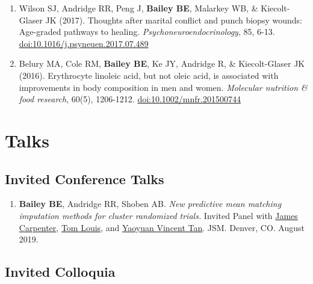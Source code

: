 \documentclass[
  fleqn, oneside]{article}
\providecommand{\tightlist}{%
  \setlength{\itemsep}{0pt}\setlength{\parskip}{0pt}}
\begin{document}
\begin{enumerate}
\item
  Wilson SJ, Andridge RR, Peng J, \textbf{Bailey BE}, Malarkey WB, \&
  Kiecolt-Glaser JK (2017). Thoughts after marital conflict and punch
  biopsy wounds: Age-graded pathways to healing.
  \emph{Psychoneuroendocrinology}, 85, 6-13.
  \href{https://doi.org/10.1016/j.psyneuen.2017.07.489}{doi:10.1016/j.psyneuen.2017.07.489}
\item
  Belury MA, Cole RM, \textbf{Bailey BE}, Ke JY, Andridge R, \&
  Kiecolt-Glaser JK (2016). Erythrocyte linoleic acid, but not oleic
  acid, is associated with improvements in body composition in men and
  women. \emph{Molecular nutrition \& food research}, 60(5), 1206-1212.
  \href{https://doi.org/10.1002/mnfr.201500744}{doi:10.1002/mnfr.201500744}
\end{enumerate}

\hypertarget{talks}{%
\section{Talks}\label{talks}}

\hypertarget{invited-conference-talks}{%
\subsection{Invited Conference Talks}\label{invited-conference-talks}}

\begin{enumerate}
\def\labelenumi{\arabic{enumi}.}
\tightlist
\item
  \textbf{Bailey BE}, Andridge RR, Shoben AB. \emph{New predictive mean
  matching imputation methods for cluster randomized trials.} Invited
  Panel with
  \href{https://www.lshtm.ac.uk/aboutus/people/carpenter.james}{James
  Carpenter},
  \href{https://www.jhsph.edu/faculty/directory/profile/900/thomas-a-louis}{Tom
  Louis}, and
  \href{https://www.researchgate.net/scientific-contributions/2115807824-Yaoyuan-Vincent-Tan}{Yaoyuan
  Vincent Tan}. JSM. Denver, CO. August 2019.
\end{enumerate}

\hypertarget{invited-colloquia}{%
\subsection{Invited Colloquia}\label{invited-colloquia}}
\end{document}
